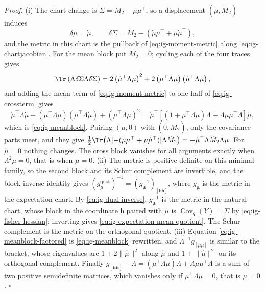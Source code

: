 \noindent\emph{Proof.}
(i) The chart change is \(\Sigma=M_2-\mu\mu^\top\), so a displacement
\((\dot\mu,\dot M_2)\) induces
\begin{equation}
\delta\mu=\dot\mu,
\qquad
\delta\Sigma=\dot M_2-\left(\dot\mu\mu^\top+\mu\dot\mu^\top\right),
\label{eq:ig-chartjacobian}
\end{equation}
and the metric in this chart is the pullback of \eqref{eq:ig-moment-metric}
along \eqref{eq:ig-chartjacobian}. For the mean block put \(\dot M_2=0\); cycling
each of the four traces gives
\begin{equation}
\Tr\left(\Lambda\delta\Sigma\Lambda\delta\Sigma\right)
=2\left(\dot\mu^\top\Lambda\mu\right)^2+2\left(\mu^\top\Lambda\mu\right)\left(\dot\mu^\top\Lambda\dot\mu\right),
\label{eq:ig-crossterm}
\end{equation}
and adding the mean term of \eqref{eq:ig-moment-metric} to one half of
\eqref{eq:ig-crossterm} gives
\begin{equation}
\dot\mu^\top\Lambda\dot\mu+\left(\mu^\top\Lambda\mu\right)\left(\dot\mu^\top\Lambda\dot\mu\right)+\left(\dot\mu^\top\Lambda\mu\right)^2
=\dot\mu^\top\left[\left(1+\mu^\top\Lambda\mu\right)\Lambda+\Lambda\mu\mu^\top\Lambda\right]\dot\mu,
\label{eq:ig-meanquad}
\end{equation}
which is \eqref{eq:ig-meanblock}. Pairing \((\dot\mu,0)\) with \((0,\dot M_2)\), only
the covariance parts meet, and they give
\(\tfrac12\Tr\bigl(\Lambda[-(\dot\mu\mu^\top+\mu\dot\mu^\top)]\Lambda\dot M_2\bigr)
=-\dot\mu^\top\Lambda\dot M_2\Lambda\mu\). For \(\dot\mu=0\) nothing changes. The
cross block vanishes for all arguments exactly when \(\Lambda^2\mu=0\), that is when
\(\mu=0\). (ii) The metric is positive definite on this minimal family, so the
second block and its Schur complement are invertible, and the block-inverse
identity gives \((g^{\mathrm{quot}}_\mu)^{-1}=(g_{\boldsymbol\mu}^{-1})_{[\mathsf h\mathsf h]}\),
where \(g_{\boldsymbol\mu}\) is the metric in the expectation chart. By
\eqref{eq:ig-dual-inverse}, \(g_{\boldsymbol\mu}^{-1}\) is the metric in the natural chart, whose
block in the coordinate \(\mathsf h\) paired with \(\mu\) is
\(\operatorname{Cov}_q(Y)=\Sigma\) by \eqref{eq:ig-fisher-hessian}; inverting gives
\eqref{eq:ig-expectation-mean-quotient}. The Schur complement is the metric on the
orthogonal quotient. (iii) Equation \eqref{eq:ig-meanblock-factored} is
\eqref{eq:ig-meanblock} rewritten, and \(\Lambda^{-1}g_{[\mu\mu]}\) is similar to the
bracket, whose eigenvalues are \(1+2\lVert\hat\mu\rVert^2\) along \(\hat\mu\) and
\(1+\lVert\hat\mu\rVert^2\) on its orthogonal complement. Finally
\(g_{[\mu\mu]}-\Lambda=(\mu^\top\Lambda\mu)\Lambda+\Lambda\mu\mu^\top\Lambda\) is a sum
of two positive semidefinite matrices, which vanishes only if
\(\mu^\top\Lambda\mu=0\), that is \(\mu=0\). \hfill$\square$

